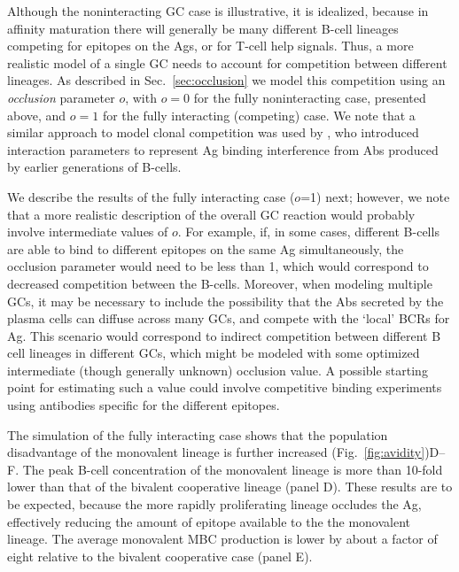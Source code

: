 \documentclass[utf8]{frontiersHLTH}%
\newcommand{\cred}[1]{\textsf{\color{red}#1}}
\newcommand{\vo}[1]{#1} %
\newcommand{\fig}[1]{Fig.~\ref{fig:#1}}
\newcommand{\Sec}[1]{Sec.~\ref{sec:#1}}
\renewcommand{\sec}[1]{\Sec{#1}}
\newcommand{\occl}{o}
\begin{document}
Although the noninteracting GC case is illustrative, it is idealized, because
in affinity maturation there will generally be many different B-cell
lineages competing for epitopes on the Ags, or for T-cell help
signals. Thus, a more realistic model of a single GC needs to account for
competition between different lineages. As described in \sec{occlusion} we
model this competition using an \textit{occlusion} parameter $\occl$, with $\occl=0$
for the fully noninteracting case, presented above, and $\occl=1$ for the fully interacting
(competing) case.
%
\cred{We note that a similar approach to model clonal competition was used by
\citet{Yan20}, who introduced interaction parameters to represent Ag
binding interference from Abs produced by earlier generations of B-cells.}

We describe the results of the fully interacting case ($\occl$=1) next; however, 
we note that a more realistic description of the overall GC reaction would probably
involve intermediate values of $o$. For example,
if, in some cases, different B-cells are able to bind to different epitopes
on the same Ag simultaneously, the occlusion parameter would need to be less than 1, which would
correspond to decreased competition between the B-cells. Moreover, when modeling
multiple GCs, it may be necessary to include the possibility that the Abs secreted by the plasma cells
can diffuse across many GCs, and compete with the `local' BCRs for
Ag.\cite{zhang13} This scenario would correspond to indirect
competition between different B cell lineages in different GCs, which might
be modeled with some optimized intermediate (though generally unknown) occlusion value.
\vo{A possible starting point for estimating such a value
could involve competitive binding experiments using antibodies specific for
the different epitopes.} 

The simulation of the fully interacting case shows that the
population disadvantage of the monovalent lineage is further increased
(\fig{avidity})D--F. The peak B-cell concentration of the monovalent lineage is more
than 10-fold lower than that of the bivalent cooperative lineage (panel D). These
results are to be expected, because the more rapidly proliferating lineage
occludes the Ag, effectively reducing the amount of epitope available to the
the monovalent lineage. The average monovalent MBC production is lower
by about a factor of \vo{eight} relative to the bivalent cooperative case (panel E).
\end{document}
